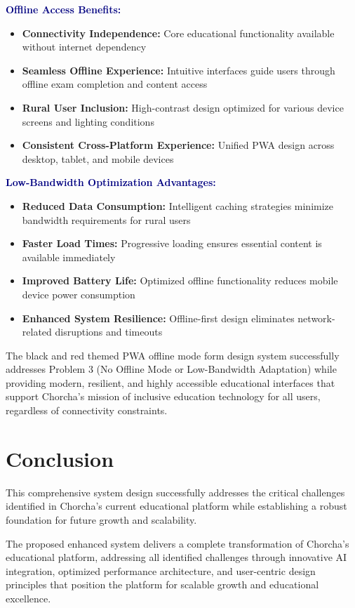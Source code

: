 \documentclass[12pt,a4paper,oneside]{book}
\begin{document}
\textbf{\textcolor{navy}{Offline Access Benefits:}}
\begin{itemize}
    \item \textbf{Connectivity Independence:} Core educational functionality available without internet dependency
    \item \textbf{Seamless Offline Experience:} Intuitive interfaces guide users through offline exam completion and content access
    \item \textbf{Rural User Inclusion:} High-contrast design optimized for various device screens and lighting conditions
    \item \textbf{Consistent Cross-Platform Experience:} Unified PWA design across desktop, tablet, and mobile devices
\end{itemize}

\textbf{\textcolor{navy}{Low-Bandwidth Optimization Advantages:}}
\begin{itemize}
    \item \textbf{Reduced Data Consumption:} Intelligent caching strategies minimize bandwidth requirements for rural users
    \item \textbf{Faster Load Times:} Progressive loading ensures essential content is available immediately
    \item \textbf{Improved Battery Life:} Optimized offline functionality reduces mobile device power consumption
    \item \textbf{Enhanced System Resilience:} Offline-first design eliminates network-related disruptions and timeouts
\end{itemize}

The black and red themed PWA offline mode form design system successfully addresses Problem 3 (No Offline Mode or Low-Bandwidth Adaptation) while providing modern, resilient, and highly accessible educational interfaces that support Chorcha's mission of inclusive education technology for all users, regardless of connectivity constraints.
\newpage
\section{Conclusion}

This comprehensive system design successfully addresses the critical challenges identified in Chorcha's current educational platform while establishing a robust foundation for future growth and scalability.

\begin{tcolorbox}[infobox, title=System Design Achievement Summary]
The proposed enhanced system delivers a complete transformation of Chorcha's educational platform, addressing all identified challenges through innovative AI integration, optimized performance architecture, and user-centric design principles that position the platform for scalable growth and educational excellence.
\end{tcolorbox}
\end{document}
